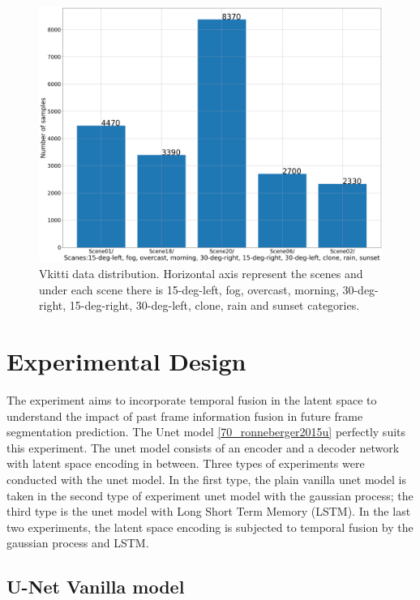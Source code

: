 	\begin{figure}
		\centering
		\includegraphics[width=14cm]{images/vkitti_scanes_samples.png}
		\caption{Vkitti data distribution. Horizontal axis represent the scenes and under each scene there is 15-deg-left, fog, overcast, morning, 30-deg-right, 15-deg-right, 30-deg-left, clone, rain and sunset categories.}
		\label{fig:scannet_vkitti}
	\end{figure}	
	
    \section{Experimental Design}
    
    The experiment aims to incorporate temporal fusion in the latent space to understand the impact of past frame information fusion in future frame segmentation prediction. The Unet model \ref{70_ronneberger2015u} perfectly suits this experiment. The unet model consists of an encoder and a decoder network with latent space encoding in between. Three types of experiments were conducted with the unet model. In the first type, the plain vanilla unet model is taken in the second type of experiment unet model with the gaussian process; the third type is the unet model with Long Short Term Memory (LSTM). In the last two experiments, the latent space encoding is subjected to temporal fusion by the gaussian process and LSTM.   
    
    \subsection{U-Net Vanilla model}
    
